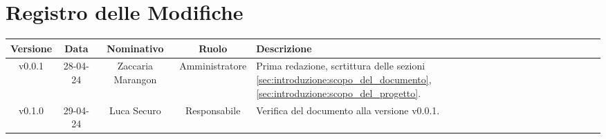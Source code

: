 \section*{\Large Registro delle Modifiche}
    \begin{table}[h]
        \centering
        \renewcommand\tabularxcolumn[1]{m{#1}} %
        \renewcommand{\arraystretch}{1.5}
        \begin{tabularx}{0.98\textwidth}
            {c|c|c|c|>{\centering\arraybackslash}X}
            \rowcolor{black}
            \textbf{\color{white} Versione} & \textbf{\color{white} Data} & \textbf{\color{white} Nominativo} & \textbf{\color{white} Ruolo} & \textbf{\color{white} Descrizione} \\ 
            \hline

            v0.0.1 & 28-04-24 & Zaccaria Marangon & Amministratore & Prima redazione, scrtittura delle sezioni \ref{sec:introduzione:scopo_del_documento},\ref{sec:introduzione:scopo_del_progetto}. \\
            v0.1.0 & 29-04-24 & Luca Securo & Responsabile & Verifica del documento alla versione v0.0.1. \\
            \hline
        \end{tabularx}
    \end{table}